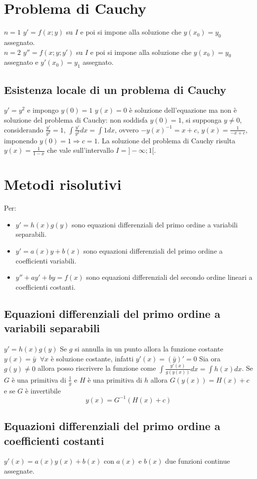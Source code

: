 \section{Problema di Cauchy}
$n=1$ $y'=f(x;y)$ su $I$ e poi si impone alla soluzione che $y(x_0)=y_0$ assegnato.\\
$n=2$ $y''=f(x;y;y')$ su $I$ e poi si impone alla soluzione che $y(x_0)=y_0$ assegnato e $y'(x_0)=y_1$ assegnato.\\
\subsection{Esistenza locale di un problema di Cauchy}
$y'=y^2$ e impongo $y(0)=1$ $y(x)=0$ \`e soluzione dell'equazione ma non \`e soluzione del problema di Cauchy: non soddisfa $y(0)=1$, si supponga $y\neq 0$, considerando 
$\frac{y'}{y^2}=1$, $\int\frac{y'}{y^2}dx=\int 1dx$, ovvero $-y(x)^{-1}=x+c$, $y(x)=\frac{1}{-x+c}$, imponendo $y(0)=1\Rightarrow c=1$. La soluzione del problema di Cauchy 
risulta $y(x)=\frac{1}{1-x}$ che vale sull'intervallo $I=]-\infty;1[$.
\section{Metodi risolutivi}
Per:
\begin{itemize}
\item $y'=h(x)g(y)$ sono equazioni differenziali del primo ordine a variabili separabili.
\item $y'=a(x)y+b(x)$ sono equazioni differenziali del primo ordine a coefficienti variabili.
\item $y''+ay'+by=f(x)$ sono equazioni differenziali del secondo ordine lineari a coefficienti costanti.
\end{itemize}
\subsection{Equazioni differenziali del primo ordine a variabili separabili}
$y'=h(x)g(y)$ Se $g$ si annulla in un punto allora la funzione costante $y(x)=\bar{y}\;\;\forall x$ \`e soluzione costante, infatti $y'(x)=(\bar{y})'=0$ Sia ora $g(y)\neq 0$ 
allora posso riscrivere la funzione come $\int\frac{y'(x)}{g(y(x))}dx=\int h(x)dx$. Se $G$ \`e una primitiva di $\frac{1}{g}$ e $H$ \`e una primitiva di $h$ allora $G(y(x))=H(x)
+c$ e se $G$ \`e invertibile
\begin{equation}
y(x)=G^{-1}(H(x)+c)
\end{equation}
\subsection{Equazioni differenziali del primo ordine a coefficienti costanti}
$y'(x)=a(x)y(x)+b(x)$ con $a(x)$ e $b(x)$ due funzioni continue assegnate.
